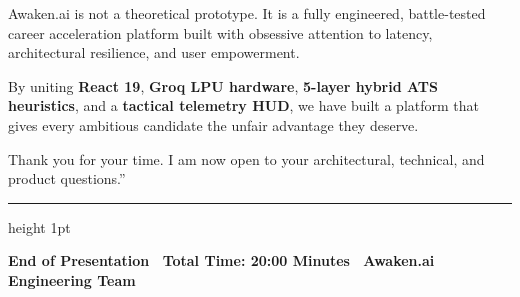 \documentclass[11pt,a4paper]{article}
\begin{document}
Awaken.ai is not a theoretical prototype. It is a fully engineered, battle-tested career acceleration platform built with obsessive attention to latency, architectural resilience, and user empowerment.

By uniting \textbf{React 19}, \textbf{Groq LPU hardware}, \textbf{5-layer hybrid ATS heuristics}, and a \textbf{tactical telemetry HUD}, we have built a platform that gives every ambitious candidate the unfair advantage they deserve.

Thank you for your time. I am now open to your architectural, technical, and product questions.''

\vspace{1.5em}
\hrule height 1pt
\vspace{1em}

\begin{center}
    {\small \textbf{\color{darkgray}End of Presentation \textbar\ Total Time: 20:00 Minutes \textbar\ Awaken.ai Engineering Team}}
\end{center}
\end{document}

